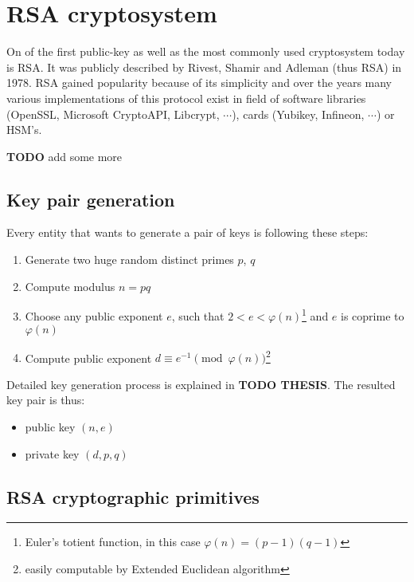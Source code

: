 \section{RSA cryptosystem}

On of the first public-key as well as the most commonly used cryptosystem today is RSA. It was publicly described by Rivest, Shamir and Adleman (thus RSA) in 1978\cite{RSA_paper}. RSA gained popularity because of its simplicity and over the years many various implementations of this protocol exist in field of software libraries (OpenSSL, Microsoft CryptoAPI, Libcrypt, $\cdots$), cards (Yubikey, Infineon, $\cdots$) or HSM's.

\textbf{TODO} add some more

\subsection*{Key pair generation}

Every entity that wants to generate a pair of keys is following these steps:

\begin{enumerate}

\item Generate two huge random distinct primes $p$, $q$
\item Compute modulus $n = pq$
\item Choose any public exponent $e$, such that $2 < e < \varphi(n)$\footnote{Euler's totient function, in this case $\varphi(n) = (p-1)(q-1)$} and $e$ is coprime to $\varphi(n)$
\item Compute public exponent $d \equiv e^{-1} \pmod{\varphi(n)}$\footnote{easily computable by Extended Euclidean algorithm}

\end{enumerate}

Detailed key generation process is explained in \textbf{TODO THESIS}. The resulted key pair is thus:

\begin{itemize}

\item public key $(n, e)$

\item private key $(d, p, q)$

\end{itemize}

\subsection*{RSA cryptographic primitives}

